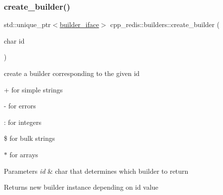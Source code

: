 \subsubsection{\texorpdfstring{create\+\_\+builder()}{create\_builder()}}
{\footnotesize\ttfamily std\+::unique\+\_\+ptr$<$\hyperlink{classcpp__redis_1_1builders_1_1builder__iface}{builder\+\_\+iface}$>$ cpp\+\_\+redis\+::builders\+::create\+\_\+builder (\begin{DoxyParamCaption}\item[{char}]{id }\end{DoxyParamCaption})}

create a builder corresponding to the given id
\begin{DoxyItemize}
\item + for simple strings
\item -\/ for errors
\item \+: for integers
\item \$ for bulk strings
\item $\ast$ for arrays
\end{DoxyItemize}


\begin{DoxyParams}{Parameters}
{\em id} & char that determines which builder to return \\
\hline
\end{DoxyParams}
\begin{DoxyReturn}{Returns}
new builder instance depending on id value 
\end{DoxyReturn}
